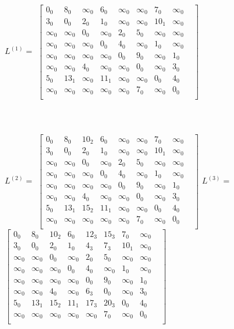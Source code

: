 \documentclass{article}
\begin{document}
$L^{(1)} = $
$\begin{bmatrix}
0_0 & 8_0 & \infty_0 & 6_0 & \infty_0 & \infty_0 & 7_0 & \infty_0 & \\
3_0 & 0_0 & 2_0 & 1_0 & \infty_0 & \infty_0 & 10_1 & \infty_0 & \\
\infty_0 & \infty_0 & 0_0 & \infty_0 & 2_0 & 5_0 & \infty_0 & \infty_0 & \\
\infty_0 & \infty_0 & \infty_0 & 0_0 & 4_0 & \infty_0 & 1_0 & \infty_0 & \\
\infty_0 & \infty_0 & \infty_0 & \infty_0 & 0_0 & 9_0 & \infty_0 & 1_0 & \\
\infty_0 & \infty_0 & 4_0 & \infty_0 & \infty_0 & 0_0 & \infty_0 & 3_0 & \\
5_0 & 13_1 & \infty_0 & 11_1 & \infty_0 & \infty_0 & 0_0 & 4_0 & \\
\infty_0 & \infty_0 & \infty_0 & \infty_0 & \infty_0 & 7_0 & \infty_0 & 0_0 & \\
\end{bmatrix}$\\\\\\\\
$L^{(2)} = $
$\begin{bmatrix}
0_0 & 8_0 & 10_2 & 6_0 & \infty_0 & \infty_0 & 7_0 & \infty_0 & \\
3_0 & 0_0 & 2_0 & 1_0 & \infty_0 & \infty_0 & 10_1 & \infty_0 & \\
\infty_0 & \infty_0 & 0_0 & \infty_0 & 2_0 & 5_0 & \infty_0 & \infty_0 & \\
\infty_0 & \infty_0 & \infty_0 & 0_0 & 4_0 & \infty_0 & 1_0 & \infty_0 & \\
\infty_0 & \infty_0 & \infty_0 & \infty_0 & 0_0 & 9_0 & \infty_0 & 1_0 & \\
\infty_0 & \infty_0 & 4_0 & \infty_0 & \infty_0 & 0_0 & \infty_0 & 3_0 & \\
5_0 & 13_1 & 15_2 & 11_1 & \infty_0 & \infty_0 & 0_0 & 4_0 & \\
\infty_0 & \infty_0 & \infty_0 & \infty_0 & \infty_0 & 7_0 & \infty_0 & 0_0 & \\
\end{bmatrix}$
$L^{(3)} = $
$\begin{bmatrix}
0_0 & 8_0 & 10_2 & 6_0 & 12_3 & 15_3 & 7_0 & \infty_0 & \\
3_0 & 0_0 & 2_0 & 1_0 & 4_3 & 7_3 & 10_1 & \infty_0 & \\
\infty_0 & \infty_0 & 0_0 & \infty_0 & 2_0 & 5_0 & \infty_0 & \infty_0 & \\
\infty_0 & \infty_0 & \infty_0 & 0_0 & 4_0 & \infty_0 & 1_0 & \infty_0 & \\
\infty_0 & \infty_0 & \infty_0 & \infty_0 & 0_0 & 9_0 & \infty_0 & 1_0 & \\
\infty_0 & \infty_0 & 4_0 & \infty_0 & 6_3 & 0_0 & \infty_0 & 3_0 & \\
5_0 & 13_1 & 15_2 & 11_1 & 17_3 & 20_3 & 0_0 & 4_0 & \\
\infty_0 & \infty_0 & \infty_0 & \infty_0 & \infty_0 & 7_0 & \infty_0 & 0_0 & \\
\end{bmatrix}$\\\\\\\\
\end{document}
